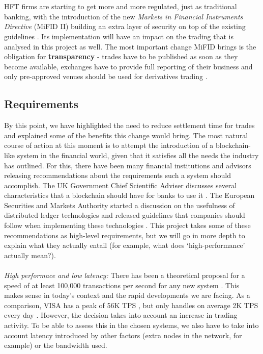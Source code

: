 \documentclass[12pt,twoside]{article}
\begin{document}
\\ \\
HFT firms are starting to get more and more regulated, just as traditional banking, with the introduction of the new \textit{Markets in Financial Instruments Directive} (MiFID II) building an extra layer of security on top of the existing guidelines \cite{mifid2}. Its implementation will have an impact on the trading that is analysed in this project as well. The most important change MiFID brings is the obligation for \textbf{transparency} \cite{transparency} - trades have to be published as soon as they become available, exchanges have to provide full reporting of their business and only pre-approved venues should be used for derivatives trading \cite{mifid2off}.

\subsection{Requirements}
\label{sub:Requirements}
By this point, we have highlighted the need to reduce settlement time for trades and explained some of the benefits this change would bring. The most natural course of action at this moment is to attempt the introduction of a blockchain-like system in the financial world, given that it satisfies all the needs the industry has outlined. For this, there have been many financial institutions and advisors releasing recommendations about the requirements such a system should accomplish. The UK Government Chief Scientific Adviser discusses several characteristics that a blockchain should have for banks to use it \cite{GOVReq}. The European Securities and Markets Authority started a discussion on the usefulness of distributed ledger technologies and released guidelines that companies should follow when implementing these technologies \cite{ESMA}. This project takes some of these recommendations as high-level requirements, but we will go in more depth to explain what they actually entail (for example, what does `high-performance' actually mean?). 
\\ \\
\textit{High performace and low latency:} There has been a theoretical proposal for a speed of at least 100,000 transactions per second for any new system \cite{Chinese}. This makes sense in today's context and the rapid developments we are facing. As a comparison, VISA has a peak of 56K TPS \cite{visa}, but only handles on average 2K TPS every day \cite{Scalability}. However, the decision takes into account an increase in trading activity. To be able to assess this in the chosen systems, we also have to take into account latency introduced by other factors (extra nodes in the network, for example) or the bandwidth used. 
\end{document}
